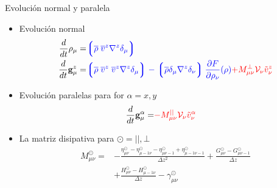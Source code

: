 \documentclass{beamer}
\newcommand{\llg}{\left\lgroup}
\newcommand{\rlg}{\right\rgroup}
\begin{document}
\begin{frame}{Evolución normal y paralela}
\begin{itemize}
  \item Evolución normal 
\begin{align}
  \frac{d}{dt}\rho_\mu=&  {\color{blue} \llg\overline{\rho} \; \overline{v}^{z}{\nabla}^{z}\delta_\mu \rlg}
\nonumber\\
    \frac{d}{dt}{{\bf g}}^{z}_\mu=&
{\color{blue} \llg\overline{\rho}\; \overline{v}^{z}\;\overline{v}^{z}{\nabla}^{z}\delta_{\mu}\rlg
-\llg\overline{\rho}\delta_{\mu}{\nabla}^{z}\delta_{\nu}\rlg
\frac{\partial  F}{\partial \rho_{\nu}}(\rho)}
{\color{red} +M_{\mu\nu}^{\bot}{\cal V}_\nu\tilde{v}^{z}_\nu}
\nonumber
\end{align}
  \item Evolución paralelas para for $\alpha=x,y$  
\begin{align}
  \frac{d}{dt}{{\bf g}}^\alpha_\mu=&{\color{red}-M_{\mu\nu}^{||}{\cal V}_\nu\tilde{v}^\alpha_\nu}
\nonumber
\end{align}
\item La matriz disipativa para $\odot=||,\bot$
\begin{align}
M^{\odot}_{\mu\nu} 
=&-\frac{\eta^{\odot}_{\mu\nu}-\eta^{\odot}_{\mu-1\nu}-\eta^{\odot}_{\mu\nu-1}+\eta^{\odot}_{\mu-1\nu-1}}{\Delta z^2}
+\frac{{G}^{\odot}_{\mu\nu}-{G}^{\odot}_{\mu\nu-1}}{\Delta z} \nonumber \\
&+\frac{{H}^{\odot}_{\mu\nu}-{H}^{\odot}_{\mu-1\nu}}{\Delta z}
-{\gamma}^{\odot}_{\mu\nu}
\nonumber
\end{align}
\end{itemize}
\end{frame}
\end{document}
